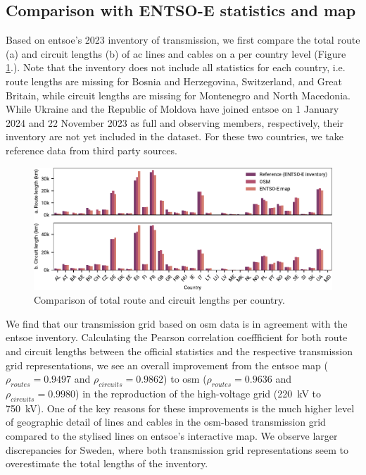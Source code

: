 \documentclass[fleqn,10pt]{wlscirep}
\let\autocite\cite
\begin{document}
\subsection*{Comparison with ENTSO-E statistics and map}
Based on \acrshort{entsoe}'s 2023 inventory of transmission,\autocite{entso-eInventoryTransmission20232024} we first compare the total route (a) and circuit lengths (b) of \acrshort{ac} lines and cables on a per country level (Figure \ref{fig:bar_lengths}.). Note that the inventory does not include all statistics for each country, i.e. route lengths are missing for Bosnia and Herzegovina, Switzerland, and Great Britain, while circuit lengths are missing for Montenegro and North Macedonia. While Ukraine and the Republic of Moldova have joined \acrshort{entsoe} on 1 January 2024 and 22 November 2023 as full and observing members, respectively, their inventory are not yet included in the dataset. For these two countries, we take reference data from third party sources.\autocite{cigrePowerSystemUkraine2018,globaldataTopFiveTransmission2023,moldelectricaTechnicalEconomicIndicators2023}

\begin{figure}[!htbp]
    \centering
    \includegraphics{figures/fig_bar_lengths.pdf}
    \caption{Comparison of total route and circuit lengths per country.}
    \label{fig:bar_lengths}
\end{figure}

We find that our transmission grid based on \gls{osm} data is in agreement with the \acrshort{entsoe} inventory. Calculating the Pearson correlation coeffficient for both route and circuit lengths between the official statistics and the respective transmission grid representations, we see an overall improvement from the \acrshort{entsoe} map ($\rho_{routes} = 0.9497$ and $\rho_{circuits} = 0.9862$) to \gls{osm} ($\rho_{routes} = 0.9636$ and $\rho_{circuits} = 0.9980$) in the reproduction of the high-voltage grid (\SI{220}{\kilo\volt} to \SI{750}{\kilo\volt}). One of the key reasons for these improvements is the much higher level of geographic detail of lines and cables in the \gls{osm}-based transmission grid compared to the stylised lines on \acrshort{entsoe}'s interactive map. We observe larger discrepancies for Sweden, where both transmission grid representations seem to overestimate the total lengths of the inventory.
\end{document}
